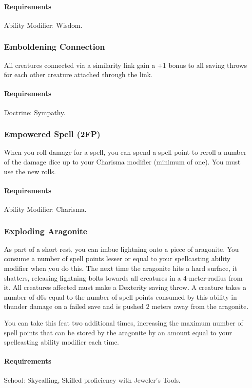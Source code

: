     \paragraph{Requirements} Ability Modifier: Wisdom.
\subsubsection{Emboldening Connection} \label{feat::emboldeningconnection}
    All creatures connected via a similarity link gain a +1 bonus to all saving throws for each other creature attached through the link.
    \paragraph{Requirements} Doctrine: Sympathy.
\subsubsection{Empowered Spell (2FP)} \label{feat::empoweredspell}
    When you roll damage for a spell, you can spend a spell point to reroll a number of the damage dice up to your Charisma modifier (minimum of one).
    You must use the new rolls.
    \paragraph{Requirements} Ability Modifier: Charisma.
\subsubsection{Exploding Aragonite} \label{feat::explodingaragonite}
    As part of a short rest, you can imbue lightning onto a piece of aragonite.
    You consume a number of spell points lesser or equal to your spellcasting ability modifier when you do this.
    The next time the aragonite hits a hard surface, it shatters, releasing lightning bolts towards all creatures in a 4-meter-radius from it.
    All creatures affected must make a Dexterity saving throw.
    A creature takes a number of d6s equal to the number of spell points consumed by this ability in thunder damage on a failed save and is pushed 2 meters away from the aragonite.

    You can take this feat two additional times, increasing the maximum number of spell points that can be stored by the aragonite by an amount equal to your spellcasting ability modifier each time.
    \paragraph{Requirements} School: Skycalling, Skilled proficiency with Jeweler's Tools.
